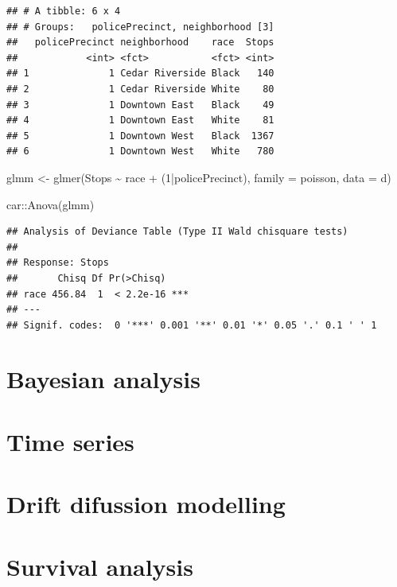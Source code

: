 \documentclass[
]{book}
\newenvironment{Shaded}{\begin{snugshade}}{\end{snugshade}}
\newcommand{\AttributeTok}[1]{\textcolor[rgb]{0.77,0.63,0.00}{#1}}
\newcommand{\DecValTok}[1]{\textcolor[rgb]{0.00,0.00,0.81}{#1}}
\newcommand{\FunctionTok}[1]{\textcolor[rgb]{0.00,0.00,0.00}{#1}}
\newcommand{\NormalTok}[1]{#1}
\newcommand{\OtherTok}[1]{\textcolor[rgb]{0.56,0.35,0.01}{#1}}
\newcommand{\SpecialCharTok}[1]{\textcolor[rgb]{0.00,0.00,0.00}{#1}}
\newcommand{\StringTok}[1]{\textcolor[rgb]{0.31,0.60,0.02}{#1}}
\begin{document}
\begin{verbatim}
## # A tibble: 6 x 4
## # Groups:   policePrecinct, neighborhood [3]
##   policePrecinct neighborhood    race  Stops
##            <int> <fct>           <fct> <int>
## 1              1 Cedar Riverside Black   140
## 2              1 Cedar Riverside White    80
## 3              1 Downtown East   Black    49
## 4              1 Downtown East   White    81
## 5              1 Downtown West   Black  1367
## 6              1 Downtown West   White   780
\end{verbatim}

\begin{Shaded}
\begin{Highlighting}[]
\NormalTok{glmm }\OtherTok{\textless{}{-}} \FunctionTok{glmer}\NormalTok{(Stops }\SpecialCharTok{\textasciitilde{}}\NormalTok{ race }\SpecialCharTok{+}\NormalTok{ (}\DecValTok{1}\SpecialCharTok{|}\NormalTok{policePrecinct),}
              \AttributeTok{family =} \StringTok{\textquotesingle{}poisson\textquotesingle{}}\NormalTok{, }\AttributeTok{data =}\NormalTok{ d)}

\NormalTok{car}\SpecialCharTok{::}\FunctionTok{Anova}\NormalTok{(glmm)}
\end{Highlighting}
\end{Shaded}

\begin{verbatim}
## Analysis of Deviance Table (Type II Wald chisquare tests)
## 
## Response: Stops
##       Chisq Df Pr(>Chisq)    
## race 456.84  1  < 2.2e-16 ***
## ---
## Signif. codes:  0 '***' 0.001 '**' 0.01 '*' 0.05 '.' 0.1 ' ' 1
\end{verbatim}

\hypertarget{bayesian-analysis}{%
\section{Bayesian analysis}\label{bayesian-analysis}}

\hypertarget{time-series}{%
\section{Time series}\label{time-series}}

\hypertarget{drift-difussion-modelling}{%
\section{Drift difussion modelling}\label{drift-difussion-modelling}}

\hypertarget{survival-analysis}{%
\section{Survival analysis}\label{survival-analysis}}

  
\end{document}

